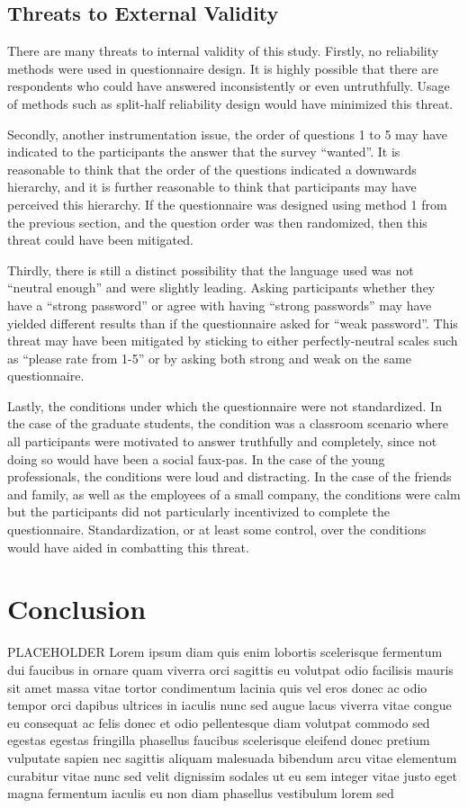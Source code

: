 \documentclass[letterpaper, 10 pt, conference]{ieeeconf}  %
\begin{document}
\subsection{Threats to External Validity}

There are many threats to internal validity of this study. Firstly, no reliability methods were used in questionnaire design. It is highly possible that there are respondents who could have answered inconsistently or even untruthfully. Usage of methods such as split-half reliability design would have minimized this threat. 

Secondly, another instrumentation issue, the order of questions 1 to 5 may have indicated to the participants the answer that the survey “wanted”. It is reasonable to think that the order of the questions indicated a downwards hierarchy, and it is further reasonable to think that participants may have perceived this hierarchy. If the questionnaire was designed using method 1 from the previous section, and the question order was then randomized, then this threat could have been mitigated.

Thirdly, there is still a distinct possibility that the language used was not “neutral enough” and were slightly leading. Asking participants whether they have a “strong password” or agree with having “strong passwords” may have yielded different results than if the questionnaire asked for “weak password”. This threat may have been mitigated by sticking to either perfectly-neutral scales such as “please rate from 1-5” or by asking both strong and weak on the same questionnaire.

Lastly, the conditions under which the questionnaire were not standardized. In the case of the graduate students, the condition was a classroom scenario where all participants were motivated to answer truthfully and completely, since not doing so would have been a social faux-pas. In the case of the young professionals, the conditions were loud and distracting. In the case of the friends and family, as well as the employees of a small company, the conditions were calm but the participants did not particularly incentivized to complete the questionnaire. Standardization, or at least some control, over the conditions would have aided in combatting this threat. 

\section{Conclusion}

PLACEHOLDER Lorem ipsum diam quis enim lobortis scelerisque fermentum dui faucibus in ornare quam viverra orci sagittis eu volutpat odio facilisis mauris sit amet massa vitae tortor condimentum lacinia quis vel eros donec ac odio tempor orci dapibus ultrices in iaculis nunc sed augue lacus viverra vitae congue eu consequat ac felis donec et odio pellentesque diam volutpat commodo sed egestas egestas fringilla phasellus faucibus scelerisque eleifend donec pretium vulputate sapien nec sagittis aliquam malesuada bibendum arcu vitae elementum curabitur vitae nunc sed velit dignissim sodales ut eu sem integer vitae justo eget magna fermentum iaculis eu non diam phasellus vestibulum lorem sed
\end{document}
